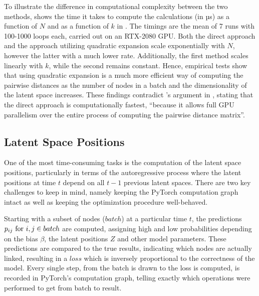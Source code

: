     To illustrate the difference in computational complexity between the two methods,  shows the time it takes to compute the calculations (in µs) as a function of $N$ and as a function of $k$ in . The timings are the mean of 7 runs with 100-1000 loops each, carried out on an RTX-2080 GPU. Both the direct approach and the approach utilizing quadratic expansion scale exponentially with $N$, however the latter with a much lower rate. Additionally, the first method scales linearly with $k$, while the second remains constant. Hence, empirical tests show that using quadratic expansion is a much more efficient way of computing the pairwise distances as the number of nodes in a batch and the dimensionality of the latent space increases. These findings contradict \citeauthor{jacobsen2018a}'s argument in \cite{jacobsen2018a}, stating that the direct approach is computationally fastest, ``because it allows full GPU parallelism over the entire process of computing the pairwise distance matrix''.
    
\subsection{Latent Space Positions}

    One of the most time-consuming tasks is the computation of the latent space positions, particularly in terms of the autoregressive process where the latent positions at time $t$ depend on all $t-1$ previous latent spaces.
    There are two key challenges to keep in mind, namely keeping the PyTorch computation graph intact as well as keeping the optimization procedure well-behaved. 
    
    Starting with a subset of nodes ($batch$) at a particular time $t$, the predictions $\sub(p)\text{ for } i,j \in batch$ are computed, assigning high and low probabilities depending on the bias $\beta$, the latent positions $Z$ and other model parameters. These predictions are compared to the true results, indicating which nodes are actually linked, resulting in a $loss$ which is inversely proportional to the correctness of the model. Every single step, from the batch is drawn to the loss is computed, is recorded in PyTorch's computation graph, telling exactly which operations were performed to get from batch to result. 
    
